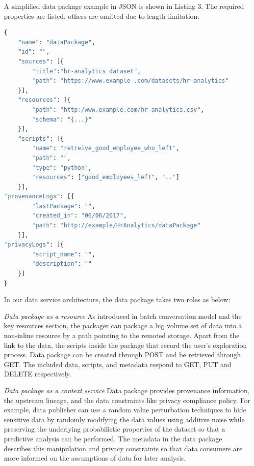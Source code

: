 \documentclass[10pt, conference, compsocconf]{IEEEtran}
\begin{document}
A simplified data package example in JSON is shown in Listing 3. The required properties are listed, others are omitted due to length limitation.
\begin{lstlisting}[language=python, caption=A Data Package Example]
{
	"name": "dataPackage",
	"id": "",
	"sources": [{
		"title":"hr-analytics dataset",
		"path": "https://www.example .com/datasets/hr-analytics"
	}],
	"resources": [{
		"path": "http:/www.example.com/hr-analytics.csv",
		"schema": "{...}"
	}],
	"scripts": [{
		"name": "retreive_good_employee_who_left",
		"path": "",
		"type": "python",
		"resources": ["good_employees_left", ".."]
	}],
"provenanceLogs": [{
		"lastPackage": "",
		"created_in": "06/06/2017",
		"path": "http://example/HrAnalytics/dataPackage"
	}],
"privacyLogs": [{
		"script_name": "",
		"description": ""
	}]
}
\end{lstlisting}

In our data service architecture, the data package takes two roles as below:

\textit{Data package as a resource} As introduced in batch conversation model and the key resources section, the packager can package a big volume set of data into a non-inline resource by a path pointing to the remoted storage. Apart from the link to the data, the scripts inside the package that record the user’s exploration process. Data package can be created through POST and be retrieved through GET. The included data, scripts, and metadata respond to GET, PUT and DELETE respectively.

\textit{Data package as a context service} Data package provides provenance information, the upstream lineage, and the data constraints like privacy compliance policy. For example, data publisher can use a random value perturbation techniques to hide sensitive data by randomly modifying the data values using additive noise while preserving the underlying probabilistic properties of the dataset so that a predictive analysis can be performed. The metadata in the data package describes this manipulation and privacy constraints so that data consumers are more informed on the assumptions of data for later analysis.
\end{document}
